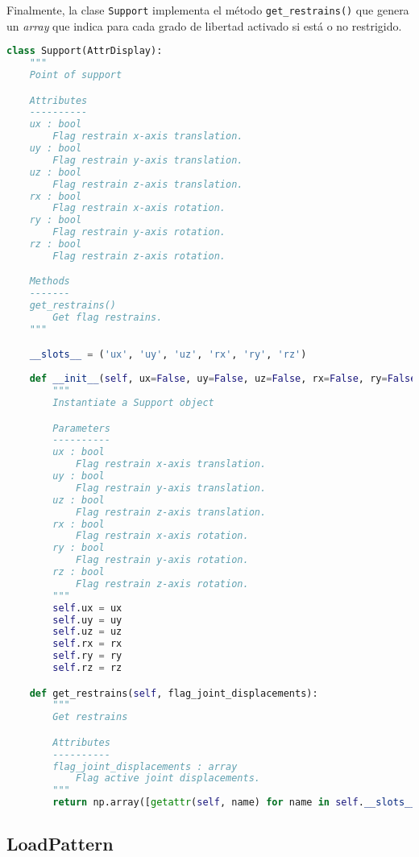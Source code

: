 Finalmente, la clase \verb|Support| implementa el método \verb|get_restrains()| que genera un \emph{array} que indica para cada grado de libertad activado si está o no restrigido.\\

\begin{lstlisting}[language=Python,caption=Clase \texttt{Support} implementada en el archivo \texttt{primitives.py}.,label=alg:Support, frame=single]
class Support(AttrDisplay):
    """
    Point of support

    Attributes
    ----------
    ux : bool
        Flag restrain x-axis translation.
    uy : bool
        Flag restrain y-axis translation.
    uz : bool
        Flag restrain z-axis translation.
    rx : bool
        Flag restrain x-axis rotation.
    ry : bool
        Flag restrain y-axis rotation.
    rz : bool
        Flag restrain z-axis rotation.

    Methods
    -------
    get_restrains()
        Get flag restrains.
    """

    __slots__ = ('ux', 'uy', 'uz', 'rx', 'ry', 'rz')
    
    def __init__(self, ux=False, uy=False, uz=False, rx=False, ry=False, rz=False):
        """
        Instantiate a Support object

        Parameters
        ----------
        ux : bool
            Flag restrain x-axis translation.
        uy : bool
            Flag restrain y-axis translation.
        uz : bool
            Flag restrain z-axis translation.
        rx : bool
            Flag restrain x-axis rotation.
        ry : bool
            Flag restrain y-axis rotation.
        rz : bool
            Flag restrain z-axis rotation.
        """
        self.ux = ux
        self.uy = uy
        self.uz = uz
        self.rx = rx
        self.ry = ry
        self.rz = rz

    def get_restrains(self, flag_joint_displacements):
        """
        Get restrains

        Attributes
        ----------
        flag_joint_displacements : array
            Flag active joint displacements.
        """
        return np.array([getattr(self, name) for name in self.__slots__])[flag_joint_displacements]
\end{lstlisting}

\subsection{LoadPattern}

